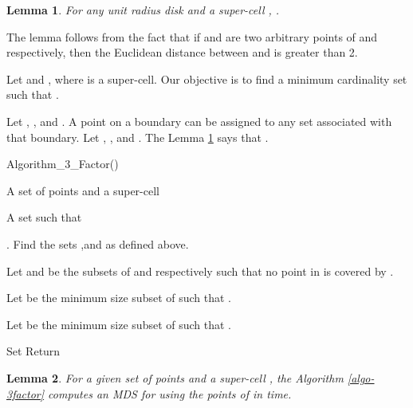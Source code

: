 \documentclass[a4paper,11pt]{article}
\newtheorem{lemma}{Lemma}
\newenvironment{proof}{\noindent {\bf Proof:\,\ }}{\hfill\mbox{\
}\smallskip}
\begin{document}
\begin{lemma} \label{lemma-6x}
For any unit radius disk  and a super-cell , . 
\end{lemma}

\begin{proof}
The lemma follows from the fact that if  and  are two arbitrary points of  and  
respectively, then the Euclidean distance between  and  is greater than 2. 
\end{proof}

Let  and , where  is a super-cell. Our objective 
is to find a minimum cardinality set  such that .

Let , , and . 
A point on a boundary can be assigned to any set associated with that boundary. Let , 
, and . The Lemma \ref{lemma-6x} says that 
. 


\begin{algorithm}
\caption{Algorithm\_3\_Factor()}
\begin{algorithmic}[1]
 A set  of  points and a super-cell 

 A set  such that 

\STATE .
\STATE Find the sets ,and  as defined above.

  \IF {()}
	\STATE Let  and  be the subsets of  and  respectively such that no point in 
	 is covered by .
	
	\STATE Let  be the minimum size subset of  such that .
	  
	\STATE Let  be the minimum size subset of  such that .
	
	\IF{()}
	    \STATE Set 
	\ENDIF
  \ENDIF
\ENDFOR
\STATE Return 
\end{algorithmic}
\label{algo-3factor}
\end{algorithm}


\begin{lemma} \label{lemma-7x}
For a given set  of  points and a super-cell , the Algorithm \ref{algo-3factor} computes an 
MDS for  using the points of  in  time.
\end{lemma}
\end{document}
